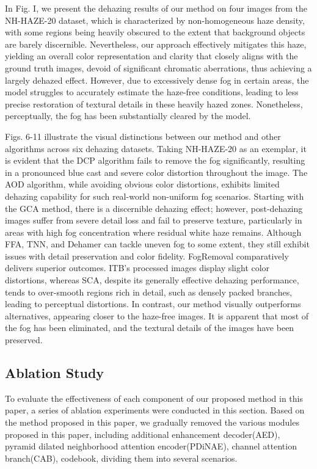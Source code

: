 \documentclass[lettersize,journal]{IEEEtran}
\begin{document}
In Fig. I, we present the dehazing results of our method on four images from the NH-HAZE-20 dataset, which is characterized by non-homogeneous haze density, with some regions being heavily obscured to the extent that background objects are barely discernible. Nevertheless, our approach effectively mitigates this haze, yielding an overall color representation and clarity that closely aligns with the ground truth images, devoid of significant chromatic aberrations, thus achieving a largely dehazed effect. However, due to excessively dense fog in certain areas, the model struggles to accurately estimate the haze-free conditions, leading to less precise restoration of textural details in these heavily hazed zones. Nonetheless, perceptually, the fog has been substantially cleared by the model.

Figs. 6-11 illustrate the visual distinctions between our method and other algorithms across six dehazing datasets. Taking NH-HAZE-20 as an exemplar, it is evident that the DCP algorithm fails to remove the fog significantly, resulting in a pronounced blue cast and severe color distortion throughout the image. The AOD algorithm, while avoiding obvious color distortions, exhibits limited dehazing capability for such real-world non-uniform fog scenarios. Starting with the GCA method, there is a discernible dehazing effect; however, post-dehazing images suffer from severe detail loss and fail to preserve texture, particularly in areas with high fog concentration where residual white haze remains. Although FFA, TNN, and Dehamer can tackle uneven fog to some extent, they still exhibit issues with detail preservation and color fidelity. FogRemoval comparatively delivers superior outcomes. ITB's processed images display slight color distortions, whereas SCA, despite its generally effective dehazing performance, tends to over-smooth regions rich in detail, such as densely packed branches, leading to perceptual distortions. In contrast, our method visually outperforms alternatives, appearing closer to the haze-free images. It is apparent that most of the fog has been eliminated, and the textural details of the images have been preserved.

\subsection{Ablation Study}
To evaluate the effectiveness of each component of our proposed method in this paper, a series of ablation experiments were conducted in this section. Based on the method proposed in this paper, we gradually removed the various modules proposed in this paper, including additional enhancement decoder(AED), pyramid dilated neighborhood attention encoder(PDiNAE), channel attention branch(CAB), codebook, dividing them into several scenarios. 
\end{document}
